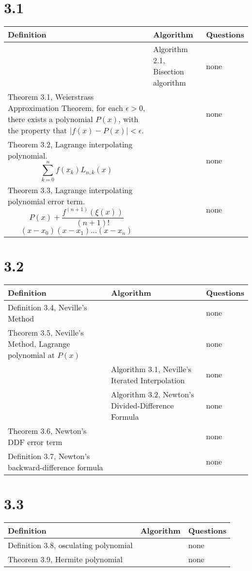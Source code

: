 \documentclass{article}
\begin{document}
\section*{3.1}

\begin{tabularx}{\textwidth}{ |X|X|X| }
    \hline
	{\bf Definition} & {\bf Algorithm} & {\bf Questions} \\
    \hline
	 & Algorithm 2.1, Bisection algorithm & none \\
    \hline
	Theorem 3.1, Weierstrass Approximation Theorem, for each $\epsilon > 0$, there exists a polynomial $P(x)$, with the property that $|f(x)-P(x)|<\epsilon$. & & none \\
    \hline
	Theorem 3.2, Lagrange interpolating polynomial. $$\sum_{k=0}^{n}f(x_k)L_{n,k}(x)$$ & & none \\
    \hline
	Theorem 3.3, Lagrange interpolating polynomial error term. $$P(x)+\frac{f^{(n+1)}(\xi(x))}{(n+1)!}$$ $$(x-x_0)(x-x_1)...(x-x_n)$$ & & none \\
    \hline
\end{tabularx}

\section*{3.2}

\begin{tabularx}{\textwidth}{ |X|X|X| }
    \hline
	{\bf Definition} & {\bf Algorithm} & {\bf Questions} \\
    \hline
	Definition 3.4, Neville's Method & & none \\
    \hline
	Theorem 3.5, Neville's Method, Lagrange polynomial at $P(x)$  & & none \\
    \hline
	 & Algorithm 3.1, Neville's Iterated Interpolation & none \\
    \hline
	 & Algorithm 3.2, Newton's Divided-Difference Formula & none \\
    \hline
	Theorem 3.6, Newton's DDF error term & & none \\
    \hline
	Definition 3.7, Newton's backward-difference formula & & none \\
    \hline
\end{tabularx}

\section*{3.3}

\begin{tabularx}{\textwidth}{ |X|X|X| }
    \hline
	{\bf Definition} & {\bf Algorithm} & {\bf Questions} \\
    \hline
	Definition 3.8, osculating polynomial & & none \\
    \hline
	Theorem 3.9, Hermite polynomial & & none \\
    \hline
\end{tabularx}
\end{document}
